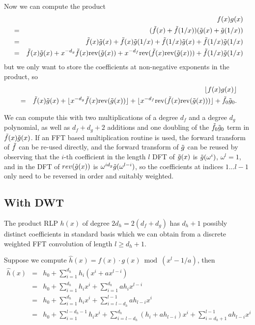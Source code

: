 \documentclass{article}
\begin{document}
Now we can compute the product
\begin{eqnarray*}
   &   & f(x)g(x) \\
   & = & (\tilde{f}(x) + \tilde{f}(1/x)) (\tilde{g}(x) + \tilde{g}(1/x)) \\
   & = & \tilde{f}(x) \tilde{g}(x) + \tilde{f}(x) \tilde{g}(1/x) + \tilde{f}(1/x)\tilde{g}(x) + \tilde{f}(1/x)\tilde{g}(1/x) \\
   & = & \tilde{f}(x) \tilde{g}(x) + x^{-d_g} \tilde{f}(x) \textrm{rev}(\tilde{g}(x)) + x^{-d_f} \textrm{rev}(\tilde{f}(x) \textrm{rev}(\tilde{g}(x))) + \tilde{f}(1/x)\tilde{g}(1/x)
\end{eqnarray*}
but we only want to store the coefficients at non-negative exponents in the 
product, so
\begin{eqnarray*}
   &   & \lfloor f(x)g(x) \rfloor \\
   & = & \tilde{f}(x) \tilde{g}(x) + \lfloor x^{-d_g} \tilde{f}(x) \textrm{rev}(\tilde{g}(x)) \rfloor + \lfloor x^{-d_f} \textrm{rev}(\tilde{f}(x) \textrm{rev}(\tilde{g}(x))) \rfloor + \tilde{f}_0 \tilde{g}_0.
\end{eqnarray*}

We can compute this with two multiplications of a degree $d_f$ and a 
degree $d_g$ polynomial, as well as $d_f + d_g + 2$ additions and one doubling
of the $\tilde{f}_0 \tilde{g}_0$ term in $\tilde{f}(x) \tilde{g}(x)$. If an FFT based 
multiplication routine is used, the forward transform of $\tilde{f}$ can be re-used
directly, and the forward transform of $\tilde{g}$ can be reused by observing that
the $i$-th coefficient in the length $l$ DFT of $\tilde{g}(x)$ is 
$\tilde{g}(\omega^i)$, $\omega^l=1$, and in the DFT of $rev(\tilde{g}(x))$ is
$\omega^{id_g} \tilde{g}(\omega^{l-i})$, so the coefficients at indices $1 \ldots l-1$ 
only need to be reversed in order and suitably weighted.

\subsection{With DWT}

The product RLP $h(x)$ of degree $2d_h = 2(d_f+d_g)$ has $d_h + 1$ 
possibly distinct coefficients in standard basis which we can obtain from
a discrete weighted FFT convolution of length $l \geq d_h + 1$.

Suppose we compute $\hat{h}(x) = f(x) \cdot g(x) \bmod (x^l - 1/a)$, then
\begin{eqnarray*}
  \hat{h}(x) & = & h_0 + \sum_{i=1}^{d_h} h_i (x^i + ax^{l-i}) \\
             & = & h_0 + \sum_{i=1}^{d_h} h_i x^i + \sum_{i=1}^{d_h} ah_i x^{l-i}\\
             & = & h_0 + \sum_{i=1}^{d_h} h_i x^i + \sum_{i=l-d_h}^{l-1} ah_{l-i} x^i\\
             & = & h_0 + 
                   \sum_{i=1}^{l-d_h-1} h_i x^i + 
                   \sum_{i=l-d_h}^{d_h} (h_i + ah_{l-i}) x^i +
                   \sum_{i=d_h+1}^{l-1} ah_{l-i} x^{i} 
\end{eqnarray*}
\end{document}
